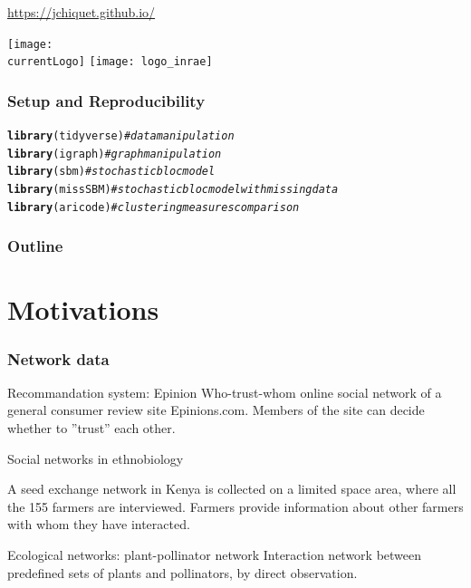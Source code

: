 \documentclass{beamer}\usepackage[]{graphicx}\usepackage[]{color}
\title{\currentCourse}
\subtitle{\huge\currentChapter\normalsize}
\institute{\currentInstitute}
\date{\currentDate}
\makeatletter
\newcommand{\hlcom}[1]{\textcolor[rgb]{0.678,0.584,0.686}{\textit{#1}}}%
\newcommand{\hlstd}[1]{\textcolor[rgb]{0.345,0.345,0.345}{#1}}%
\newcommand{\hlkwd}[1]{\textcolor[rgb]{0.737,0.353,0.396}{\textbf{#1}}}%
\newenvironment{kframe}{%
 \def\at@end@of@kframe{}%
 \ifinner\ifhmode%
  \def\at@end@of@kframe{\end{minipage}}%
  \begin{minipage}{\columnwidth}%
 \fi\fi%
 \def\FrameCommand##1{\hskip\@totalleftmargin \hskip-\fboxsep
 \colorbox{shadecolor}{##1}\hskip-\fboxsep
     \hskip-\linewidth \hskip-\@totalleftmargin \hskip\columnwidth}%
 \MakeFramed {\advance\hsize-\width
   \@totalleftmargin\z@ \linewidth\hsize
   \@setminipage}}%
 {\par\unskip\endMakeFramed%
 \at@end@of@kframe}
\newenvironment{knitrout}{}{} %
\def\currentLogo{../common_figs/logo_apt}
\newcommand{\dotitlepage}{%
  \begin{frame}
    \titlepage
    \vfill
    \begin{center}
        \scriptsize\url{https://jchiquet.github.io/}
    \end{center}
    \vfill
    \texttt{[image: \\currentLogo]}\hfill
    \texttt{[image: logo\_inrae]}
  \end{frame}
}
\makeatother
\begin{document}
\dotitlepage

\begin{frame}[fragile]
  \frametitle{Setup and Reproducibility}
  
\begin{knitrout}\scriptsize
{}\color{fgcolor}\begin{kframe}
\begin{alltt}
\hlkwd{library}\hlstd{(tidyverse)} \hlcom{# data manipulation}
\hlkwd{library}\hlstd{(igraph)}    \hlcom{# graph manipulation}
\hlkwd{library}\hlstd{(sbm)}       \hlcom{# stochastic bloc model}
\hlkwd{library}\hlstd{(missSBM)}   \hlcom{# stochastic bloc model with missing data}
\hlkwd{library}\hlstd{(aricode)}   \hlcom{# clustering measures comparison}
\end{alltt}
\end{kframe}
\end{knitrout}



\end{frame}

\begin{frame}
  \frametitle{Outline}
  \tableofcontents
\end{frame}

\section{Motivations}

\begin{frame}
  \frametitle{Network data}

  \begin{block}{Recommandation system: Epinion}
Who-trust-whom online social network of a general consumer review site Epinions.com. Members of the site can decide whether to ''trust'' each other. 

\end{block}

\begin{block}{Social networks in ethnobiology}

A seed exchange network in Kenya is collected on a limited space area, where all the 155 farmers are interviewed. Farmers provide information about other farmers with whom they have interacted.

\end{block}

\begin{block}{Ecological networks: plant-pollinator network}
Interaction network between predefined sets of plants and pollinators, by direct observation.
\end{block}

\end{frame}
\end{document}
